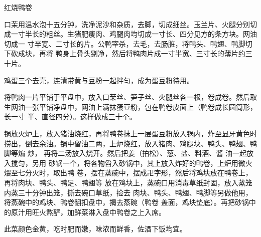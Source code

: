 \begin{recipe}{红烧鸭卷}

\ingredients


\preparation

\step 口茉用温水泡十五分钟，洗净泥沙和杂质，去脚，切成细丝。玉兰片、火腿分别切
成一寸半长的粗丝。生猪肥瘦肉、鸡腿肉均切成一寸长、四分见方的条方块。网油切成一
寸半宽、二寸长的片。公鸭宰杀，去毛，去肠脏，将鸭头、鸭翅、鸭脚切下砍成块，再将
鸭身上骨头剔净，然后将鸭肉片成一寸半宽、三寸长的薄片约三十片。

\step 鸡蛋三个去壳，连清带黄与豆粉一起拌匀，成为蛋豆粉待用。

\step 将鸭肉一片平铺于平盘中，放入口茉丝、笋子丝、火腿丝各一根，卷成卷。然后取
生网油一张平铺净盘中，网油上满抹蛋豆粉，包在鸭卷皮面上（鸭卷成长圆筒形，长一寸
半、直径四分）。这样做成三十个。

\step 锅放火炉上，放入猪油烧红，再将鸭卷抹上一层蛋豆粉放入锅内，炸至显牙黄色时
捞出，倒去余油。锅中留油二两，上炉烧红，放入猪肉、鸡腿块、鸭头、鸭翅、鸭脚等煸
炒， 再将二汤放入烧开。然后把姜（拍松）、葱、盐、料酒、酱 油一起放入搅匀，另用
砂锅一个，将各物舀入砂锅中，其上放入炸好的鸭卷，上炉用微火煨至七分火时，取出鸭
卷，摆在蒸碗中，摆成卍字形，然后将鸡块放在鸭卷上，再将肉块、鸭头、鸭足、鸭翅等
放在鸡块上，蒸碗口用消毒草纸封固，放入蒸笼内蒸三十分钟出笼，撕去碗口草纸，捡去
肉块、鸭头、鸭翅、鸭脚等另做他用，将蒸碗中的鸡块、鸭卷翻扣盘中，揭去蒸碗（鸭卷
盖面，鸡块垫底）。再把砂锅中的原汁用旺火熬酽，加鲜菜淋入盘中鸭卷之上入席。

\features

此菜颜色金黄，吃时肥而嫩，味浓而鲜香，佐酒下饭均宜。

\end{recipe}

